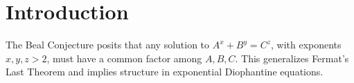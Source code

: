 
\section{Introduction}
The Beal Conjecture posits that any solution to \( A^x + B^y = C^z \), with exponents \( x, y, z > 2 \),
must have a common factor among \( A, B, C \). This generalizes Fermat's Last Theorem and implies structure
in exponential Diophantine equations.
